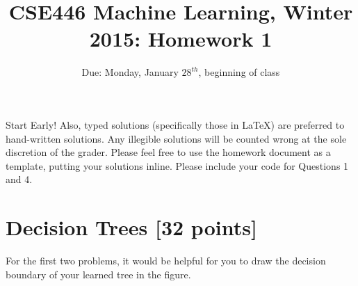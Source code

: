 \documentclass[letterpaper]{article}
\title{CSE446 Machine Learning, Winter 2015: Homework 1}
\date{Due: Monday, January $28^{th}$, beginning of class}
\begin{document}
\maketitle

\noindent Start Early! Also, typed solutions (specifically those in LaTeX) are preferred to hand-written solutions. Any illegible solutions will be counted wrong at the sole discretion of the grader. Please feel free to use the homework document as a template, putting your solutions inline. Please include your code for Questions 1 and 4.

\section{Decision Trees [32 points]}
For the first two problems, it would be helpful for you to draw the decision boundary of your learned tree in the figure.
\end{document}
